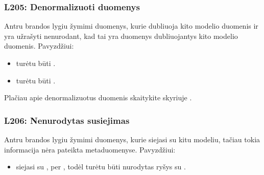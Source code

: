 \documentclass[letterpaper,10pt,lithuanian]{sphinxmanual}
\begin{document}
\subsubsection{L205: Denormalizuoti duomenys}
\label{\detokenize{branda:l205-denormalizuoti-duomenys}}\label{\detokenize{branda:l205}}
\sphinxAtStartPar
Antru brandos lygiu žymimi duomenys, kurie dubliuoja kito modelio duomenis ir
yra užrašyti nenurodant, kad tai yra duomenys dubliuojantys kito modelio
duomenis. Pavyzdžiui:
\begin{itemize}
\item {} 
\sphinxAtStartPar
{} turėtu būti .

\item {} 
\sphinxAtStartPar
{} turėtu būti
.

\end{itemize}

\sphinxAtStartPar
Plačiau apie denormalizuotus duomenis skaitykite skyriuje {\hyperref[\detokenize{identifikatoriai:ref-denorm}]{}}.


\subsubsection{L206: Nenurodytas susiejimas}
\label{\detokenize{branda:l206-nenurodytas-susiejimas}}\label{\detokenize{branda:l206}}
\sphinxAtStartPar
Antru brandos lygiu žymimi duomenys, kurie siejasi su kitu modeliu, tačiau
tokia informacija nėra pateikta metaduomenyse. Pavyzdžiui:
\begin{itemize}
\item {} 
\sphinxAtStartPar
{} \sphinxhyphen{}  siejasi su , per
, todėl turėtu būti nurodytas 
ryšys su .

\end{itemize}
\end{document}
